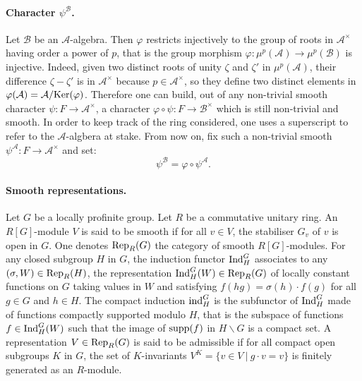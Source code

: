 \documentclass[11pt]{article}
\theoremstyle{plain}
\theoremstyle{definition}
\theoremstyle{plain}
\theoremstyle{definition}
\theoremstyle{plain}
\begin{document}
\paragraph{Character $\psi^\mathcal{B}$.} Let $\mathcal{B}$ be an $\mathcal{A}$-algebra.  Then $\varphi$ restricts injectively to the group of roots in $\mathcal{A}^\times$ having order a power of $p$, that is the group morphism $\varphi : \mu^p(\mathcal{A}) \to \mu^p(\mathcal{B})$ is injective. Indeed, given two distinct roots of unity $\zeta$ and $\zeta'$ in $\mu^p(\mathcal{A})$, their difference $\zeta - \zeta'$ is in $\mathcal{A}^\times$ because $p \in \mathcal{A}^\times$, so they define two distinct elements in $\varphi(\mathcal{A}) = \mathcal{A} / \textup{Ker}(\varphi)$. Therefore one can build, out of any non-trivial smooth character $\psi : F \to \mathcal{A}^\times$, a character $\varphi \circ \psi : F \to \mathcal{B}^\times$ which is still non-trivial and smooth. In order to keep track of the ring considered, one uses a superscript to refer to the $\mathcal{A}$-algbera at stake. From now on, fix such a non-trivial smooth $\psi^\mathcal{A} : F \to \mathcal{A}^\times$ and set:
$$\psi^\mathcal{B}=\varphi \circ \psi^\mathcal{A}.$$


\paragraph{Smooth representations.} Let $G$ be a locally profinite group. Let $R$ be a commutative unitary ring. An $R[G]$-module $V$ is said to be smooth if for all $v \in V$, the stabiliser $G_v$ of $v$ is open in $G$. One denotes $\textup{Rep}_R(G)$ the category of smooth $R[G]$-modules. For any closed subgroup $H$ in $G$, the induction functor $\textup{Ind}_H^G$ associates to any $(\sigma,W) \in \textup{Rep}_R(H)$, the representation $\textup{Ind}_H^G(W) \in \textup{Rep}_R(G)$ of locally constant functions on $G$ taking values in $W$ and satisfying $f(h g) = \sigma(h) \cdot f(g)$ for all $g \in G$ and $h \in H$. The compact induction $\textup{ind}_H^G$ is the subfunctor of $\textup{Ind}_H^G$ made of functions compactly supported modulo $H$, that is the subspace of functions $f \in \textup{Ind}_H^G(W)$ such that the image of $\textup{supp}(f)$ in $H \backslash G$ is a compact set. A representation $V \in \textup{Rep}_R(G)$ is said to be admissible if for all compact open subgroups $K$ in $G$, the set of $K$-invariants $V^K = \{ v \in V \ | \ g \cdot v = v \}$ is finitely generated as an $R$-module.
\end{document}
